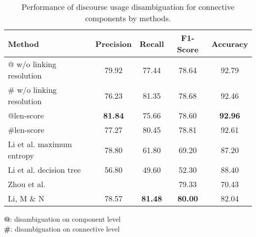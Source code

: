 \begin{table}[ht]
\centering
\begin{tabular}{|l|c|c|c|c|}
\hline

\bf Method                    & \bf Precision & \bf Recall & \bf F1-Score & \bf Accuracy \\ \hline
    @ w/o linking resolution  &     79.92     &     77.44  &     78.64    &     92.79    \\ \hline
    \# w/o linking resolution &     76.23     &     81.35  &     78.68    &     92.46    \\ \hline
    @len-score                & \bf 81.84     &     75.66  &     78.60    & \bf 92.96    \\ \hline
    \#len-score               &     77.27     &     80.45  &     78.81    &     92.61    \\

\hhline{|=|=|=|=|=|}

    Li et al. maximum entropy &     78.80     &     61.80  &     69.20    &     87.20    \\ \hline
    Li et al. decision tree   &     56.80     &     49.60  &     52.30    &     88.40    \\

\hhline{|=|=|=|=|=|}

    Zhou et al.               &               &            &     79.33    &     70.43    \\ \hline
    Li, M \& N                &     78.57     & \bf 81.48  & \bf 80.00    &     82.04    \\ \hline

\end{tabular}
\begin{flushleft}
\small
\textbf{@}: disambiguation on component level \\
\textbf{\#}: disambiguation on connective level \\
\end{flushleft}
\caption{\label{t:recognition-methods} Performance of discourse usage
disambiguation for connective components by methods. }
\end{table}
